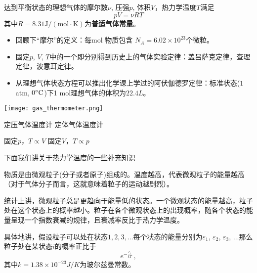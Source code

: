 \documentclass[CJK]{beamer}
\begin{document}
\begin{frame}
\bch
{\large 达到平衡状态的理想气体的摩尔数$\nu$, 压强$p$, 体积$V$，热力学温度$T$满足
{\color{blue}
$$p V = \nu RT$$
}
其中$R=8.31 \mathrm{J/(mol\cdot K)}$为{\bf 普适气体常量}。
}

{\small
\begin{itemize}
\item{回顾下“摩尔”的定义：每mol 物质包含 $N_A = 6.02\times 10^{23}$个微粒。}
\item{固定$p$, $V$, $T$中的一个即分别得到历史上的气体实验定律：盖吕萨克定律，查理定律，波意耳定律。}
\item{从理想气体状态方程可以推出化学课上学过的阿伏伽德罗定律：标准状态($1$ atm, $0^\circ \mathrm{C}$)下1 mol理想气体的体积为$22.4L$。}
\end{itemize}
}
\ech
\end{frame}

\begin{frame}
\bch

\texttt{[image: gas\_thermometer.png]}


定压气体温度计 \hspace{0.5in} 定体气体温度计

固定$p$，$T\propto V$ \hspace{0.6in}  固定$V$，$T\propto p$

\ech
\end{frame}


\begin{frame}
\bch
下面我们讲关于热力学温度的一些补充知识
\ech
\end{frame}

\begin{frame}
\bch
\bitem
\item{物质是由微观粒子(分子或者原子)组成的。温度越高，代表微观粒子的能量越高（对于气体分子而言，这就意味着粒子的运动越剧烈）。}
\item{统计上讲，微观粒子总是更趋向于能量低的状态。一个微观状态的能量越高，粒子处在这个状态上的概率越小。粒子在各个微观状态上的出现概率，随各个状态的能量呈现一个指数衰减的规律，且衰减率反比于热力学温度。

具体地讲，假设粒子可以处在状态$1,2,3,\ldots$每个状态的能量分别为$\varepsilon_1$, $\varepsilon_2$, $\varepsilon_3$, $\ldots$那么粒子处在某状态$i$的概率正比于
$$e^{-\frac{\epsilon_i}{k T}}\, ,$$其中$k=1.38\times 10^{-23} J/K$为玻尔兹曼常数。
}
\eitem

\ech
\end{frame}
\end{document}
